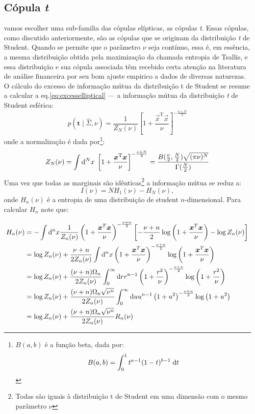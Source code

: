 \subsection{Cópula \textit{t}}
 vamos escolher uma sub-familia das cópulas elípticas, as cópulas \textit{t}. Essas cópulas, como discutido anteriormente, são as cópulas que se originam da distribuição \textit{t} de Student. Quando se permite que o parâmetro $\nu$ seja contínuo, essa é, em essência, a mesma distribuição obtida pela maximização da chamada entropia de Tsallis, e essa distribuição e sua cópula associada têm recebido certa atenção na literatura de análise financeira por seu bom ajuste empirico a dados de diversas naturezas\cite{Demarta2005, Borland2002}. O cálculo do excesso de informação mútua da distribuição t de Student se resume a calcular a eq.\eqref{eq:excesselliptical} --- a informação mútua da distribuição \textit{t} de Student esférica:
\begin{equation}
	p(\mathbf{t}\mid \hat{\Sigma},\nu) =  \frac{1}{Z_{N}(\nu)}\left[1+ \frac{\vec{x}^{\mathrm{T}}\vec{x}}{\nu}\right]^{-\frac{\nu+N}{2}}
\end{equation}
onde a normalização é dada por\footnote{$B(a,b)$ é a função beta, dada por: \[B(a,b) = \int_0^1t^{a-1}(1-t)^{b-1}\;\mathrm{d} 	t\]}:
\begin{equation}
  Z_N(\nu) = \int \mathrm{d}^N x \;\left[1+ \frac{\bm{x}^{\mathrm{T}}\bm{x}}{\nu}\right]^{-\frac{\nu+N}{2}} =  \frac{B(\frac{\nu}{2},\frac{N}{2})\sqrt{(\pi\nu)^{N}}}{\Gamma(\frac{N}{2})}
\end{equation}
Uma vez que todas as marginais são idênticas\footnote{Todas são iguais à distribuição t de Student em uma dimensão com o mesmo parâmetro $\nu$} a informação mútua se reduz a:
\begin{equation}
 I(\nu) =  N H_{1}(\nu) - H_{N}(\nu),
\end{equation}
onde $H_n(\nu)$ é a entropia de uma distribuição de student $n$-dimensional. Para calcular $H_n$ note que:
\begin{fullwidth}
\begin{align*}
H_n(\nu) &= -\int \mathrm{d}^n x \frac{1}{Z_n(\nu)} \left(1 + \frac{\bm{x}^T\bm{x}}{\nu}\right)^{-\frac{\nu+n}{2}} \left[-\frac{\nu+n}{2} \log\left(1 + \frac{\bm{x}^T\bm{x}}{\nu}\right) -\log Z_n(\nu)\right] \\
	 &= \log Z_n(\nu) + \frac{\nu+n}{2Z_n(\nu)} \int \mathrm{d}^n x \left(1 + \frac{\bm{x}^T\bm{x}}{\nu}\right)^{-\frac{\nu+n}{2}} \log\left(1 + \frac{\bm{x}^T\bm{x}}{\nu}\right) \\
	 &= \log Z_n(\nu) + \frac{(\nu+n)\Omega_{n}}{2Z_n(\nu)}  \int_{0}^\infty \mathrm{d} r r^{n-1} \left(1+\frac{r^2}{\nu}\right)^{-\frac{\nu+n}{2}}\log\left(1 + \frac{r^2}{\nu}\right)\\
	 &= \log Z_n(\nu) + \frac{(\nu+n)\Omega_{n}\sqrt{\nu^n}}{2Z_n(\nu)}  \int_{0}^\infty \mathrm{d} u u^{n-1} \left(1+u^2\right)^{-\frac{\nu+n}{2}}\log\left(1 + u^2\right)\\
	 &= \log Z_n(\nu) + \frac{(\nu+n)\Omega_{n}\sqrt{\nu^n}}{2Z_n(\nu)}  R_n(\nu)
\end{align*}
\end{fullwidth}
